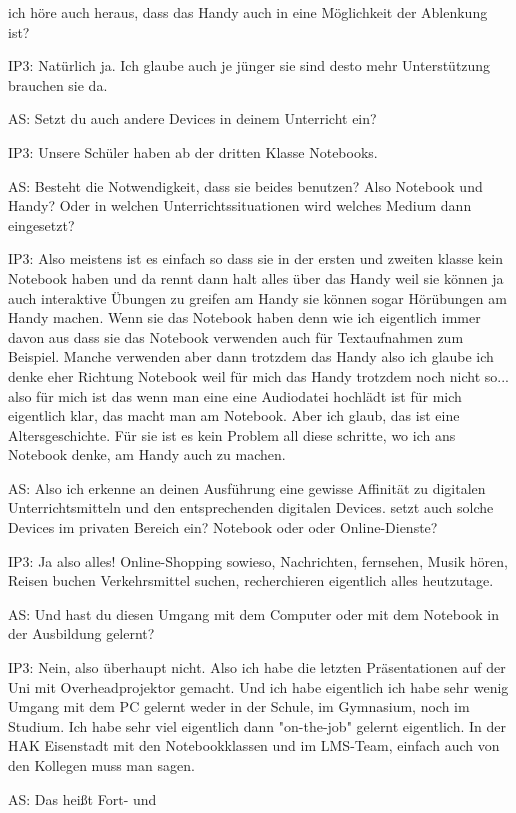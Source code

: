 \documentclass[fontsize=11pt,paper=a4]{scrbook}
\begin{document}
{\begin{itemize*}
ich höre auch heraus, dass das Handy auch in
eine Möglichkeit der Ablenkung ist?
\item[IP3:]Natürlich
ja.
Ich glaube auch je jünger sie sind desto
mehr Unterstützung brauchen sie
da.
\item[AS:] Setzt du auch andere Devices in deinem Unterricht ein?
\item[IP3:]Unsere Schüler
haben ab der dritten Klasse Notebooks.
\item[AS:]Besteht die Notwendigkeit, dass sie beides benutzen? Also Notebook und Handy? Oder in
welchen Unterrichtssituationen wird
welches Medium dann eingesetzt?
\item[IP3:] Also meistens ist es einfach so dass sie in der ersten und zweiten klasse kein Notebook haben
und da rennt dann halt alles über das
Handy weil sie können ja auch
interaktive Übungen zu greifen am Handy
sie können sogar Hörübungen am Handy
machen. Wenn sie das Notebook haben denn
wie ich eigentlich immer davon aus dass
sie das Notebook verwenden auch für Textaufnahmen zum Beispiel. Manche verwenden
aber dann trotzdem das Handy
also ich glaube ich denke eher Richtung
Notebook weil für mich das Handy trotzdem
noch nicht so...
also für mich ist das wenn man eine eine
Audiodatei hochlädt ist für mich
eigentlich klar, das macht man am Notebook. Aber ich glaub, das ist eine Altersgeschichte. Für sie ist es kein Problem
all diese schritte, wo ich ans Notebook denke,
am Handy auch zu machen.
\item[AS:]  Also ich erkenne
an deinen Ausführung eine gewisse Affinität
zu digitalen Unterrichtsmitteln und den entsprechenden digitalen Devices. setzt auch solche Devices im privaten Bereich ein? Notebook
oder oder Online-Dienste?
\item[IP3:] Ja also alles!
Online-Shopping sowieso, Nachrichten, fernsehen, Musik hören, Reisen buchen
Verkehrsmittel suchen, recherchieren
eigentlich alles heutzutage.
\item[AS:] Und hast du diesen Umgang mit dem
Computer oder mit dem Notebook in
der Ausbildung gelernt?
\item[IP3:] Nein, also
überhaupt nicht.
Also ich habe die letzten Präsentationen
auf der Uni mit Overheadprojektor gemacht. Und
ich habe eigentlich 
ich habe sehr wenig Umgang mit dem PC
gelernt weder in der Schule, im Gymnasium,
noch im Studium.
Ich habe sehr viel eigentlich dann "on-the-job" gelernt eigentlich. In der HAK Eisenstadt mit den Notebookklassen und
im LMS-Team, einfach auch von den Kollegen
muss man sagen.
\item[AS:] Das heißt Fort- und

\end{itemize*}}
\end{document}
